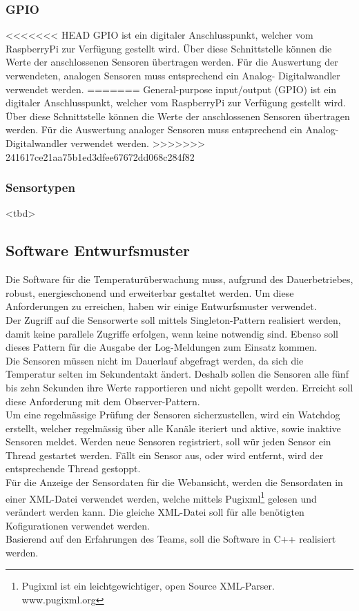 \subsubsection{GPIO}
<<<<<<< HEAD
GPIO ist ein digitaler Anschlusspunkt, welcher vom RaspberryPi zur Verfügung gestellt wird. Über diese Schnittstelle können die Werte der anschlossenen Sensoren übertragen werden. Für die Auswertung der verwendeten, analogen Sensoren muss entsprechend ein Analog- Digitalwandler verwendet werden.
=======
General-purpose input/output (GPIO) ist ein digitaler Anschlusspunkt, welcher vom RaspberryPi zur Verfügung gestellt wird. Über diese Schnittstelle können die Werte der anschlossenen Sensoren übertragen werden. Für die Auswertung analoger Sensoren muss entsprechend ein Analog- Digitalwandler verwendet werden.
>>>>>>> 241617ce21aa75b1ed3dfee67672dd068c284f82

\subsubsection{Sensortypen}
<tbd>

\subsection{Software Entwurfsmuster}
Die Software für die Temperaturüberwachung muss, aufgrund des Dauerbetriebes, robust, energieschonend und erweiterbar gestaltet werden. Um diese Anforderungen zu erreichen, haben wir einige Entwurfsmuster verwendet.\\
Der Zugriff auf die Sensorwerte soll mittels Singleton-Pattern realisiert werden, damit keine parallele Zugriffe erfolgen, wenn keine notwendig sind. Ebenso soll dieses Pattern für die Ausgabe der Log-Meldungen zum Einsatz kommen.\\
Die Sensoren müssen nicht im Dauerlauf abgefragt werden, da sich die Temperatur selten im Sekundentakt ändert. Deshalb sollen die Sensoren alle fünf bis zehn Sekunden ihre Werte rapportieren und nicht gepollt werden. Erreicht soll diese Anforderung mit dem Observer-Pattern.\\
Um eine regelmässige Prüfung der Sensoren sicherzustellen, wird ein Watchdog erstellt, welcher regelmässig über alle Kanäle iteriert und aktive, sowie inaktive Sensoren meldet. Werden neue Sensoren registriert, soll wür jeden Sensor ein Thread gestartet werden. Fällt ein Sensor aus, oder wird entfernt, wird der entsprechende Thread gestoppt.\\
Für die Anzeige der Sensordaten für die Webansicht, werden die Sensordaten in einer XML-Datei verwendet werden, welche mittels Pugixml\footnote{Pugixml ist ein leichtgewichtiger, open Source XML-Parser. www.pugixml.org} gelesen und verändert werden kann. Die gleiche XML-Datei soll für alle benötigten Kofigurationen verwendet werden.\\
Basierend auf den Erfahrungen des Teams, soll die Software in C++ realisiert werden.
